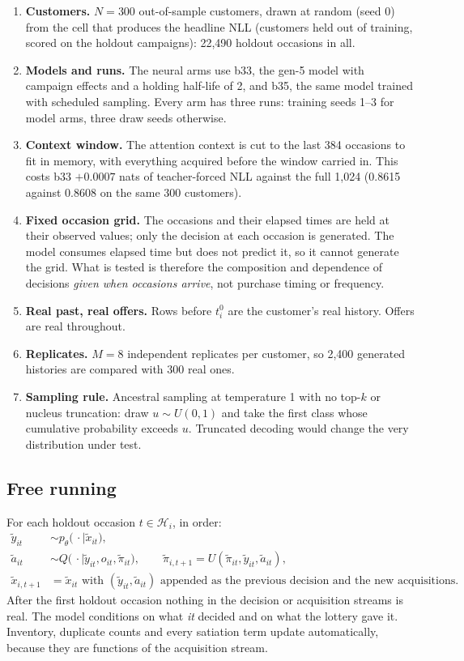 \documentclass[11pt]{article}
\begin{document}
\begin{enumerate}
\item \textbf{Customers.} $N=300$ out-of-sample customers, drawn at random
  (seed 0) from the cell that produces the headline NLL (customers held out of
  training, scored on the holdout campaigns): 22,490 holdout occasions in all.
\item \textbf{Models and runs.} The neural arms use b33, the gen-5 model with
  campaign effects and a holding half-life of 2, and b35, the same model
  trained with scheduled sampling. Every arm has three runs: training seeds
  1--3 for model arms, three draw seeds otherwise.
\item \textbf{Context window.} The attention context is cut to the last 384
  occasions to fit in memory, with everything acquired before the window carried
  in. This costs b33 $+0.0007$ nats of teacher-forced NLL against the full 1,024
  (0.8615 against 0.8608 on the same 300 customers).
\item \textbf{Fixed occasion grid.} The occasions and their elapsed times are
  held at their observed values; only the decision at each occasion is
  generated. The model consumes elapsed time but does not predict it, so it
  cannot generate the grid. What is tested is therefore the composition and
  dependence of decisions \emph{given when occasions arrive}, not purchase
  timing or frequency.
\item \textbf{Real past, real offers.} Rows before $t_i^0$ are the customer's
  real history. Offers are real throughout.
\item \textbf{Replicates.} $M=8$ independent replicates per customer, so 2,400
  generated histories are compared with 300 real ones.
\item \textbf{Sampling rule.} Ancestral sampling at temperature 1 with no top-$k$
  or nucleus truncation: draw $u \sim U(0,1)$ and take the first class whose
  cumulative probability exceeds $u$. Truncated decoding would change the very
  distribution under test.
\end{enumerate}

\subsection{Free running}

For each holdout occasion $t \in \mathcal{H}_i$, in order:
\begin{align}
\tilde y_{it} &\sim p_\theta\big(\,\cdot \mid \tilde x_{it}\big), \\
\tilde a_{it} &\sim Q\big(\,\cdot \mid \tilde y_{it}, o_{it}, \tilde\pi_{it}\big),
\qquad \tilde \pi_{i,t+1} = U(\tilde\pi_{it}, \tilde y_{it}, \tilde a_{it}),\\
\tilde x_{i,t+1} &= \tilde x_{it} \text{ with } (\tilde y_{it}, \tilde a_{it})
\text{ appended as the previous decision and the new acquisitions.}
\end{align}
After the first holdout occasion nothing in the decision or acquisition streams
is real. The model conditions on what \emph{it} decided and on what the lottery
gave it. Inventory, duplicate counts and every satiation term update
automatically, because they are functions of the acquisition stream.
\end{document}
